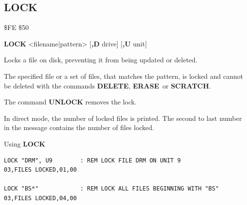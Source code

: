 \subsection{LOCK}
\begin{description}[leftmargin=2cm,style=nextline]
\item [Token:]    \$FE \$50

\item [Format:]   {\bf LOCK} <filename|pattern> [{\bf,D} drive] [{\bf,U} unit]

\item [Usage:]    Locks a file on disk, preventing it from being updated or deleted.

                  The specified file or a set of files, that matches the pattern, is locked and cannot be deleted with the commands {\bf DELETE}, {\bf ERASE} or {\bf SCRATCH}.

                  The command {\bf UNLOCK} removes the lock.

                  \filenamedefinition

                  \drivedefinition

                  \unitdefinition

\item [Remarks:]  In direct mode, the number of locked files is printed. The second to last number in the message contains the number of files locked.

\item [Examples:] Using {\bf LOCK}

\begin{tcolorbox}[colback=black,coltext=white]
\verbatimfont{\codefont}
\begin{verbatim}
LOCK "DRM", U9        : REM LOCK FILE DRM ON UNIT 9
03,FILES LOCKED,01,00

LOCK "BS*"            : REM LOCK ALL FILES BEGINNING WITH "BS"
03,FILES LOCKED,04,00
\end{verbatim}
\end{tcolorbox}
\end{description}


\newpage
